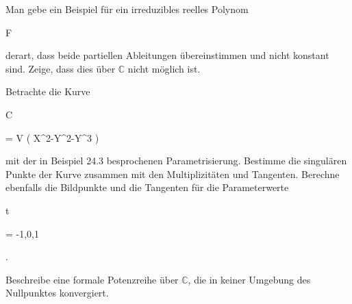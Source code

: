 {}

{


Man gebe ein Beispiel für ein irreduzibles reelles Polynom


\mavergleichskette

{\vergleichskette

{ F
}

{ \in }{ \R[X,Y]
}

{  }{
}

{    }{
}

{   }{
}

}
{}{}{}
derart, dass beide partiellen Ableitungen übereinstimmen und nicht konstant sind. Zeige, dass dies über ${\mathbb C}$ nicht möglich ist.


}

{} {}



{}

{


Betrachte die Kurve


\mavergleichskette

{\vergleichskette

{ C
}

{ = }{ V \left(  X^2-Y^2-Y^3  \right)
}

{  }{
}

{    }{
}

{   }{
}

}
{}{}{}
mit der in
Beispiel 24.3
besprochenen Parametrisierung. Bestimme die singulären Punkte der Kurve zusammen mit den Multiplizitäten und Tangenten. Berechne ebenfalls die Bildpunkte und die Tangenten für die Parameterwerte


\mavergleichskette

{\vergleichskette

{ t
}

{ = }{ -1,0,1
}

{  }{
}

{    }{
}

{   }{
}

}
{}{}{.}


}

{} {}



{}

{


Beschreibe eine formale Potenzreihe über ${\mathbb C}$, die in keiner Umgebung des Nullpunktes konvergiert.


}

{} {}


